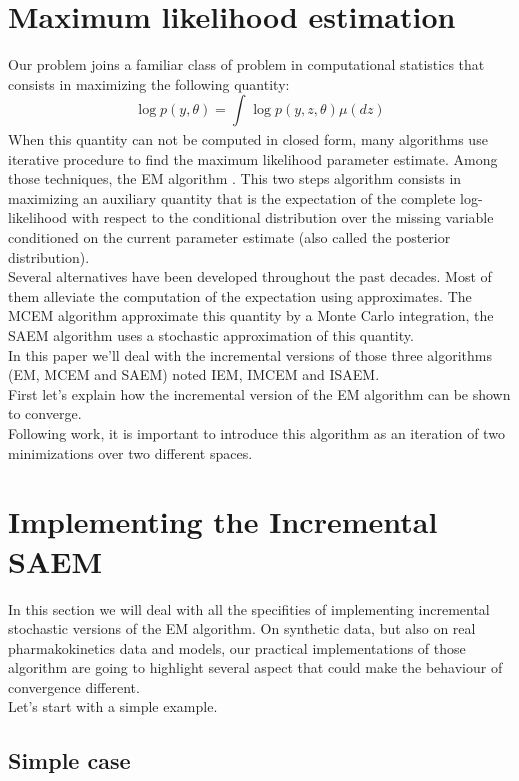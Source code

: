 \documentclass[a4paper]{article}
\theoremstyle{plain}
\theoremstyle{plain}
\theoremstyle{definition}
\begin{document}
\section{Maximum likelihood estimation}
Our problem joins a familiar class of problem in computational statistics that consists in maximizing the following quantity:
\begin{equation}
\log p(y,\theta) = \int_{}{\log p(y,z,\theta)\mu(dz)}
\end{equation}
When this quantity can not be computed in closed form, many algorithms use iterative procedure to find the maximum likelihood parameter estimate. Among those techniques, the EM algorithm \citep{dempster}. This two steps algorithm consists in maximizing an auxiliary quantity that is the expectation of the complete log-likelihood with respect to the conditional distribution over the missing variable conditioned on the current parameter estimate (also called the posterior distribution).\\
Several alternatives have been developed throughout the past decades. Most of them alleviate the computation of the expectation using approximates. The MCEM algorithm \citep{diebolt} approximate this quantity by a Monte Carlo integration, the SAEM algorithm \citep{lavielle} uses a stochastic approximation of this quantity.\\
In this paper we'll deal with the incremental versions of those three algorithms (EM, MCEM and SAEM) noted IEM, IMCEM and ISAEM.
\\
First let's explain how the incremental version of the EM algorithm can be shown to converge.\\
Following \citep{byrne} work, it is important to introduce this algorithm as an iteration of two minimizations over two different spaces.

\section{Implementing the Incremental SAEM}
In this section we will deal with all the specifities of implementing incremental stochastic versions of the EM algorithm. On synthetic data, but also on real pharmakokinetics data and models, our practical implementations of those algorithm are going to highlight several aspect that could make the behaviour of convergence different.\\
Let's start with a simple example.

\subsection{Simple case}
\end{document}
